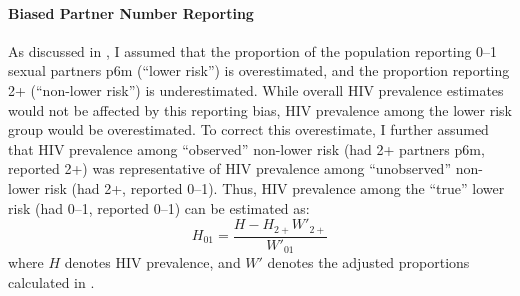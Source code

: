 \paragraph{Biased Partner Number Reporting}
As discussed in , I assumed that
the proportion of the population reporting 0--1 sexual partners p6m
(``lower risk'') is overestimated,
and the proportion reporting 2+ (``non-lower risk'') is underestimated.
While overall HIV prevalence estimates would not be affected by this reporting bias,
HIV prevalence among the lower risk group would be overestimated.
To correct this overestimate, I further assumed that
HIV prevalence among ``observed'' non-lower risk (had 2+ partners p6m, reported 2+)
was representative of HIV prevalence among ``unobserved'' non-lower risk (had 2+, reported 0--1).
Thus, HIV prevalence among the ``true'' lower risk (had 0--1, reported 0--1) can be estimated as:
\begin{equation}
  H_{01} = \frac{H - H_{2+}W'_{2+}}{W'_{01}}
\end{equation}
where $H$ denotes HIV prevalence,
and $W'$ denotes the adjusted proportions calculated in .
